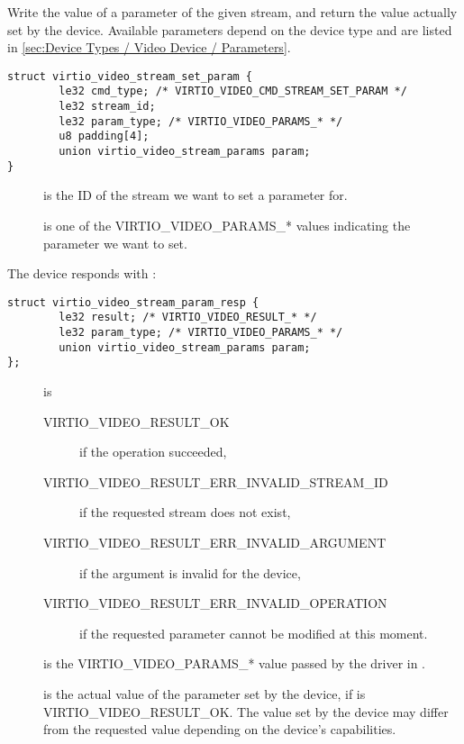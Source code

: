 Write the value of a parameter of the given stream, and return the value
actually set by the device. Available parameters depend on the device
type and are listed in
\ref{sec:Device Types / Video Device / Parameters}.

\begin{lstlisting}
struct virtio_video_stream_set_param {
        le32 cmd_type; /* VIRTIO_VIDEO_CMD_STREAM_SET_PARAM */
        le32 stream_id;
        le32 param_type; /* VIRTIO_VIDEO_PARAMS_* */
        u8 padding[4];
        union virtio_video_stream_params param;
}
\end{lstlisting}

\begin{description}
\item[]
is the ID of the stream we want to set a parameter for.
\item[]
is one of the VIRTIO\_VIDEO\_PARAMS\_* values indicating the parameter
we want to set.
\end{description}

The device responds with :

\begin{lstlisting}
struct virtio_video_stream_param_resp {
        le32 result; /* VIRTIO_VIDEO_RESULT_* */
        le32 param_type; /* VIRTIO_VIDEO_PARAMS_* */
        union virtio_video_stream_params param;
};
\end{lstlisting}

\begin{description}
\item[]
is

\begin{description}
\item[VIRTIO\_VIDEO\_RESULT\_OK]
if the operation succeeded,
\item[VIRTIO\_VIDEO\_RESULT\_ERR\_INVALID\_STREAM\_ID]
if the requested stream does not exist,
\item[VIRTIO\_VIDEO\_RESULT\_ERR\_INVALID\_ARGUMENT]
if the  argument is invalid for the device,
\item[VIRTIO\_VIDEO\_RESULT\_ERR\_INVALID\_OPERATION]
if the requested parameter cannot be modified at this moment.
\end{description}
\item[]
is the VIRTIO\_VIDEO\_PARAMS\_* value passed by the driver in
.
\item[]
is the actual value of the parameter set by the device, if
 is VIRTIO\_VIDEO\_RESULT\_OK. The value set by the device
may differ from the requested value depending on the device's
capabilities.
\end{description}

